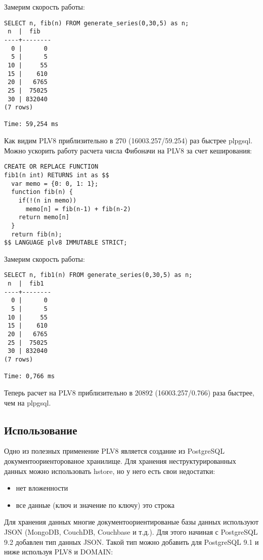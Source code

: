 Замерим скорость работы:

\begin{lstlisting}[label=lst:plv8js4,caption=Скорость расчета числа Фибоначи на plv8]
SELECT n, fib(n) FROM generate_series(0,30,5) as n;
 n  |  fib   
----+--------
  0 |      0
  5 |      5
 10 |     55
 15 |    610
 20 |   6765
 25 |  75025
 30 | 832040
(7 rows)

Time: 59,254 ms
\end{lstlisting}

Как видим PLV8 приблизительно в 270 (16003.257/59.254) раз быстрее plpgsql. Можно ускорить работу расчета числа Фибоначи на PLV8 за счет кеширования:

\begin{lstlisting}[label=lst:plv8js5,caption=Фибоначи на plv8]
CREATE OR REPLACE FUNCTION
fib1(n int) RETURNS int as $$
  var memo = {0: 0, 1: 1};
  function fib(n) {
    if(!(n in memo))
      memo[n] = fib(n-1) + fib(n-2)
    return memo[n]
  }
  return fib(n);
$$ LANGUAGE plv8 IMMUTABLE STRICT;
\end{lstlisting}

Замерим скорость работы:

\begin{lstlisting}[label=lst:plv8js6,caption=Скорость расчета числа Фибоначи на plv8]
SELECT n, fib1(n) FROM generate_series(0,30,5) as n;
 n  |  fib1  
----+--------
  0 |      0
  5 |      5
 10 |     55
 15 |    610
 20 |   6765
 25 |  75025
 30 | 832040
(7 rows)

Time: 0,766 ms
\end{lstlisting}

Теперь расчет на PLV8 приблизительно в 20892 (16003.257/0.766) раза быстрее, чем на plpgsql.

\subsection{Использование}

Одно из полезных применение PLV8 является создание из PostgreSQL документоориенторованое хранилище. Для хранения неструктурированных данных можно использовать hstore, но у него есть свои недостатки:

\begin{itemize}
\item нет вложенности
\item все данные (ключ и значение по ключу) это строка
\end{itemize}

Для хранения данных многие документоориентированые базы данных используют JSON (MongoDB, CouchDB, Couchbase и т.д.). Для этого начиная с PostgreSQL 9.2 добавлен тип данных JSON. Такой тип можно добавить для PostgreSQL 9.1 и ниже используя PLV8 и DOMAIN:

